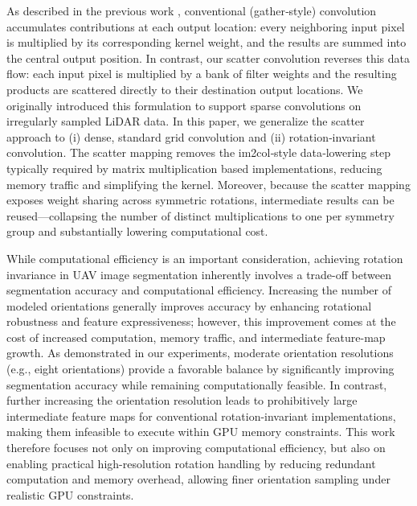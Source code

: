 As described in the previous work \cite{manduhu2025airbornesensedetectdrones}, conventional (gather‑style) convolution accumulates contributions at each output location: every neighboring input pixel is multiplied by its corresponding kernel weight, and the results are summed into the central output position. In contrast, our scatter convolution reverses this data flow: each input pixel is multiplied by a bank of filter weights and the resulting products are scattered directly to their destination output locations. We originally introduced this formulation to support sparse convolutions on irregularly sampled LiDAR data. In this paper, we generalize the scatter approach to (i) dense, standard grid convolution and (ii) rotation‑invariant convolution. The scatter mapping removes the im2col‑style data‑lowering step typically required by matrix multiplication based implementations, reducing memory traffic and simplifying the kernel. Moreover, because the scatter mapping exposes weight sharing across symmetric rotations, intermediate results can be reused—collapsing the number of distinct multiplications to one per symmetry group and substantially lowering computational cost.


While computational efficiency is an important consideration, achieving rotation invariance in UAV image segmentation inherently involves a trade-off between segmentation accuracy and computational efficiency. Increasing the number of modeled orientations generally improves accuracy by enhancing rotational robustness and feature expressiveness; however, this improvement comes at the cost of increased computation, memory traffic, and intermediate feature-map growth. As demonstrated in our experiments, moderate orientation resolutions (e.g., eight orientations) provide a favorable balance by significantly improving segmentation accuracy while remaining computationally feasible. In contrast, further increasing the orientation resolution leads to prohibitively large intermediate feature maps for conventional rotation-invariant implementations, making them infeasible to execute within GPU memory constraints. This work therefore focuses not only on improving computational efficiency, but also on enabling practical high-resolution rotation handling by reducing redundant computation and memory overhead, allowing finer orientation sampling under realistic GPU constraints.


